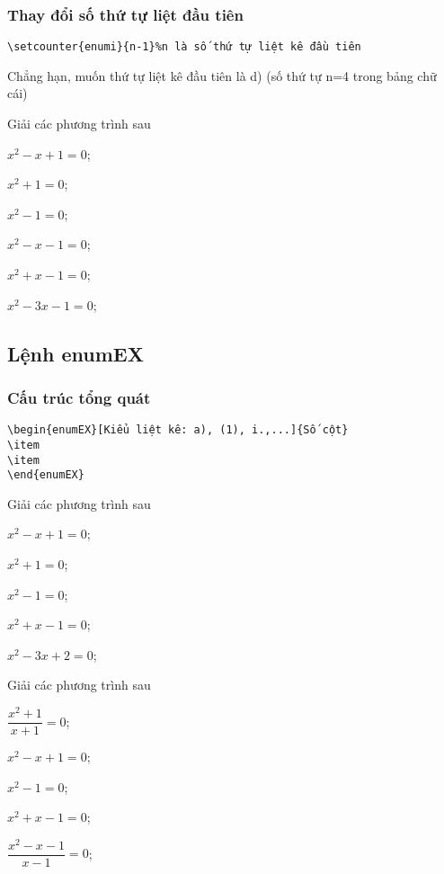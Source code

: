 \documentclass[12pt,a4paper,oneside]{article}
\begin{document}
\subsubsection{Thay đổi số thứ tự  liệt đầu tiên}
\begin{verbatim}
\setcounter{enumi}{n-1}%n là số thứ tự liệt kê đầu tiên
\end{verbatim}
\def\listEXenumi{\alph{enumi})}
Chẳng hạn, muốn thứ tự liệt kê đầu tiên là d) (số thứ tự n=4 trong bảng chữ cái)
\setcounter{enumi}{3}
\begin{ex}
Giải các phương trình sau
\begin{listEX}[3]
\item $x^2-x+1=0$;
\item $x^2+1=0$;
\item $x^2-1=0$;
\item $x^2-x-1=0$;
\item $x^2+x-1=0$;
\item $x^2-3x-1=0$;
\end{listEX}
\end{ex}
\subsection{Lệnh enumEX}
\subsubsection{Cấu trúc tổng quát}
\begin{verbatim}
\begin{enumEX}[Kiểu liệt kê: a), (1), i.,...]{Số cột}
\item 
\item 
\end{enumEX}
\end{verbatim}
\begin{ex}
Giải các phương trình sau
\begin{enumEX}[(i)]{3}
\item $x^2-x+1=0$;
\item $x^2+1=0$;
\item $x^2-1=0$;
\item $x^2+x-1=0$;
\item $x^2-3x+2=0$;
\end{enumEX}
\end{ex}
\begin{ex}
Giải các phương trình sau
\begin{enumEX}[(a)]{3}
\item $\dfrac{x^2+1}{x+1}=0$;
\item $x^2-x+1=0$;
\item $x^2-1=0$;
\item $x^2+x-1=0$;
\item $\dfrac{x^2-x-1}{x-1}=0$;
\end{enumEX}
\end{ex}
\end{document}
